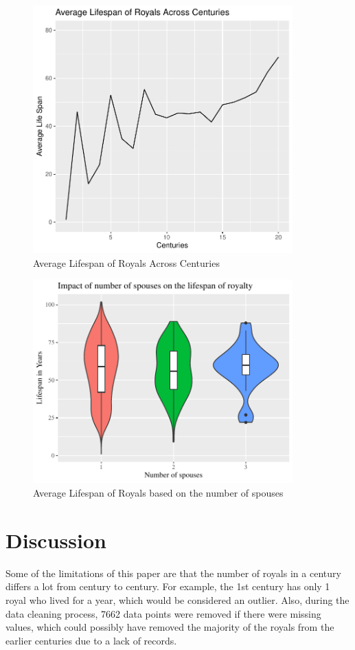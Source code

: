 \documentclass{article}
\begin{document}
\begin{figure}[h!]
    \centering
    \includegraphics[width=10cm]{Average Lifespan of Royals Across Centuries.pdf}
    \caption{Average Lifespan of Royals Across Centuries}
    \label{fig:my_label}
\end{figure}

\begin{figure}[h!]
    \centering
    \includegraphics[width=10cm]{spouse_lifespan_violin.pdf}
    \caption{Average Lifespan of Royals based on the number of spouses}
    \label{fig:my_label}
\end{figure}

\section{Discussion}
Some of the limitations of this paper are that the number of royals in a century differs a lot from century to century. For example, the 1st century has only 1 royal who lived for a year, which would be considered an outlier. Also, during the data cleaning process, 7662 data points were removed if there were missing values, which could possibly have removed the majority of the royals from the earlier centuries due to a lack of records. 
\end{document}
